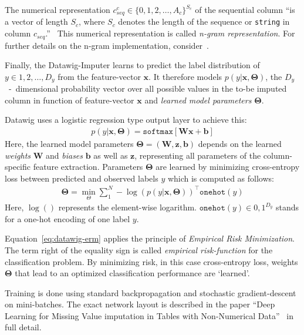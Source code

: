 The numerical representation \( c_{seq}^{c} \in \{ 0, 1, 2, \dots, A_c \}^{S_c} \) of the sequential column ``is a vector of length \( S_c \), where \( S_c \) denotes the length of the sequence or \texttt{string} in column \( c_{seq} \).''~\cite[p.~2020]{BIE18}
This numerical representation is called \emph{n-gram representation}.
For further details on the n-gram implementation, consider~\cite[p.~2020]{BIE18}.

Finally, the Datawig-Imputer learns to predict the label distribution of \( y \in {1, 2, \dots, D_y} \) from the feature-vector \( \mathbold{x} \).
It therefore models \( p(y|\mathbold{x},\mathbold{\Theta}) \), the \( D_y \)~-~dimensional probability vector over all possible values in the to-be imputed column in function of feature-vector \( \mathbold{x} \) and \emph{learned model parameters} \( \mathbold{\Theta} \).~\cite[p.~2021]{BIE18}

Datawig uses a logistic regression type output layer to achieve this:
\begin{align*}
    p(y|\mathbold{x},\mathbold{\Theta}) = \texttt{softmax}[\mathbold{Wx} + \mathbold{b}]
\end{align*}
Here, the learned model parameters \( \mathbold{\Theta} = (\mathbold{W}, \mathbold{z}, \mathbold{b}) \) depends on the learned \emph{weights} \( \mathbold{W} \) and \emph{biases} \( \mathbold{b} \) as well as \( \mathbold{z} \), representing all parameters of the column-specific feature extraction.
Parameters \( \mathbold{\Theta} \) are learned by minimizing cross-entropy loss between predicted and observed labels \( y \) which is computed as follows:
\begin{align}\label{eq:datawig-erm}
    \mathbold{\Theta} = \min_{\Theta} \sum\nolimits_{1}^{N} - \log\left(p\left(y|\mathbold{x}, \mathbold{\Theta}\right)\right)^\top \texttt{onehot}(y)
\end{align}
Here, \( \log() \) represents the element-wise logarithm.
\( \texttt{onehot}(y) \in {0, 1}^{D_y}\) stands for a one-hot encoding of one label \( y \).

Equation~\ref{eq:datawig-erm} applies the principle of \emph{Empirical Risk Minimization}.~\cite[p.~832]{VAP92}
The term right of the equality sign is called \emph{empirical risk-function} for the classification problem.
By minimizing risk, in this case cross-entropy loss, weights \( \mathbold{\Theta} \) that lead to an optimized classification performance are `learned'.

Training is done using standard backpropagation and stochastic gradient-descent on mini-batches.
The exact network layout is described in the paper ``Deep Learning for Missing Value imputation in Tables with Non-Numerical Data''~\cite[p.~2022]{BIE18} in full detail.

